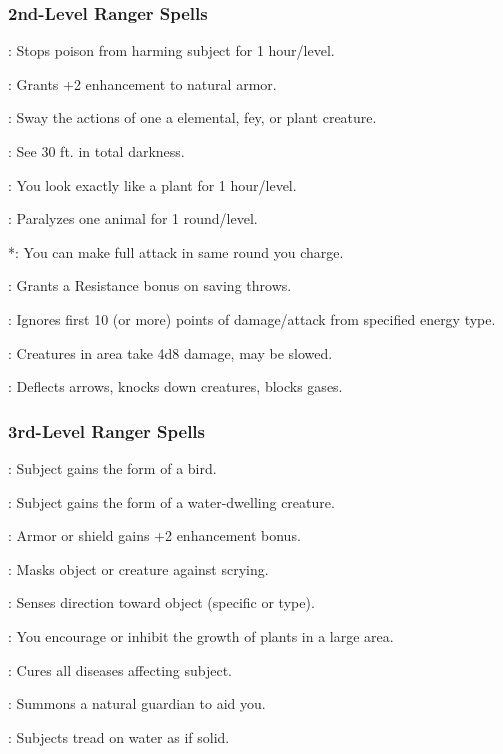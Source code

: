 \subsubsection{2nd-Level Ranger Spells}
\begin{list}{}{\leftmargin=1em}
\item {}: Stops poison from harming subject for 1 hour/level.
\item {}: Grants +2 enhancement to natural armor.
\item {}: Sway the actions of one a elemental, fey, or plant creature.
\item {}: See 30 ft. in total darkness.
\item {}: You look exactly like a plant for 1 hour/level.
\item {}: Paralyzes one animal for 1 round/level.
\item {}*: You can make full attack in same round you charge.
\item {}: Grants a Resistance bonus on saving throws.
\item {}: Ignores first 10 (or more) points of damage/attack from specified energy type.
\item {}: Creatures in area take 4d8 damage, may be slowed.
\item {}: Deflects arrows, knocks down creatures, blocks gases.
\end{list}
\subsubsection{3rd-Level Ranger Spells}
\begin{list}{}{\leftmargin=1em}
\item {}: Subject gains the form of a bird.
\item {}: Subject gains the form of a water-dwelling creature.
\item {}: Armor or shield gains +2 enhancement bonus.
\item {}: Masks object or creature against scrying.
\item {}: Senses direction toward object (specific or type).
\item {}: You encourage or inhibit the growth of plants in a large area.
\item {}: Cures all diseases affecting subject.
\item {}: Summons a natural guardian to aid you.
\item {}: Subjects tread on water as if solid.
\end{list}
